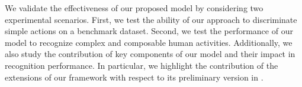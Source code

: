 We validate the effectiveness of our proposed model by considering two experimental scenarios.
First, we test the ability of our approach to discriminate simple actions on a
benchmark dataset.
Second, we test the performance of our model to recognize complex and
composable human activities. Additionally, we also study the contribution of key components of our 
model
and their impact in recognition performance.
In particular, we highlight the contribution of the extensions of our
framework with respect to its preliminary version in \cite{Lillo2014}.

\begin{comment}
\subsection{Recognition of simple actions}
\label{subsec:exp_setup}


\subsection{Recognition of composable activities}
\label{subsec:experiments_summary}


\subsection{Impact of motion descriptor}
\label{subsec:exp_motion_descriptor}


\subsection{Impact of handling non-informative poses}
\label{subsec:exp_non_info_handling}


\subsection{Impact of sparse regularizer}
\label{subsec:sparse_reg}




\end{comment}


%
%

